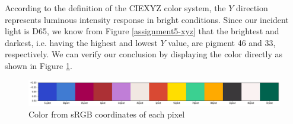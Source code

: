 According to the definition of the CIEXYZ color system, the $Y$ direction represents luminous intensity response in bright conditions. Since our incident light is D65, we know from Figure \ref{assignment5-xyz} that the brightest and darkest, i.e. having the highest and lowest $Y$ value, are pigment 46 and 33, respectively. We can verify our conclusion by displaying the color directly as shown in Figure \ref{assignment5-sanity-check}.

\begin{figure}[h]
    \centering
    \includegraphics[width=1.0\textwidth]{figures/assignment5/assignment5-sanity-check.png}
    \caption{Color from sRGB coordinates of each pixel}
    \label{assignment5-sanity-check}
\end{figure}




